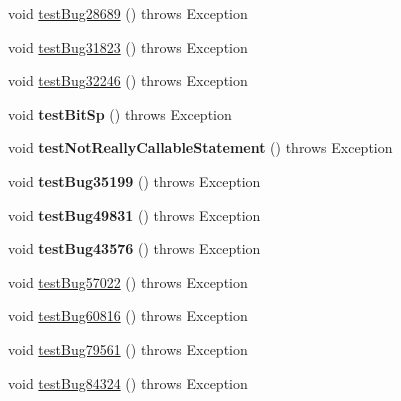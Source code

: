 \begin{DoxyCompactItemize}
\item 
void \mbox{\hyperlink{classtestsuite_1_1regression_1_1_callable_statement_regression_test_ad52f0f9cf573c237f9b51732bcb429e8}{test\+Bug28689}} ()  throws Exception 
\item 
void \mbox{\hyperlink{classtestsuite_1_1regression_1_1_callable_statement_regression_test_a28a91e6259cced18e90ef08947170c38}{test\+Bug31823}} ()  throws Exception 
\item 
void \mbox{\hyperlink{classtestsuite_1_1regression_1_1_callable_statement_regression_test_ae409019fbd71b0dbfac43b3a30ed326e}{test\+Bug32246}} ()  throws Exception 
\item 
\mbox{\label{classtestsuite_1_1regression_1_1_callable_statement_regression_test_a62d50b9afe5d1c0ea97602443566a8b7}} 
void {\bfseries test\+Bit\+Sp} ()  throws Exception 
\item 
\mbox{\label{classtestsuite_1_1regression_1_1_callable_statement_regression_test_a4ec3dd37af3e283e5fd49d2337ff02b3}} 
void {\bfseries test\+Not\+Really\+Callable\+Statement} ()  throws Exception 
\item 
\mbox{\label{classtestsuite_1_1regression_1_1_callable_statement_regression_test_a179ee076f989c2634e8cd243f235985a}} 
void {\bfseries test\+Bug35199} ()  throws Exception 
\item 
\mbox{\label{classtestsuite_1_1regression_1_1_callable_statement_regression_test_a80c90630b43a2beb90c1aca47ae09ea4}} 
void {\bfseries test\+Bug49831} ()  throws Exception 
\item 
\mbox{\label{classtestsuite_1_1regression_1_1_callable_statement_regression_test_a354d9bdc0017ec0672d80b636718c136}} 
void {\bfseries test\+Bug43576} ()  throws Exception 
\item 
void \mbox{\hyperlink{classtestsuite_1_1regression_1_1_callable_statement_regression_test_a9d71a6ee60ddbf67fdc1efadaca6af56}{test\+Bug57022}} ()  throws Exception 
\item 
void \mbox{\hyperlink{classtestsuite_1_1regression_1_1_callable_statement_regression_test_adf4d392882f055ca081e7af6441af0e5}{test\+Bug60816}} ()  throws Exception 
\item 
void \mbox{\hyperlink{classtestsuite_1_1regression_1_1_callable_statement_regression_test_a0e24518b290873422733e33c74b12bcb}{test\+Bug79561}} ()  throws Exception 
\item 
void \mbox{\hyperlink{classtestsuite_1_1regression_1_1_callable_statement_regression_test_a7cc37b690fbb8450333631f6cd408c1d}{test\+Bug84324}} ()  throws Exception 
\end{DoxyCompactItemize}
